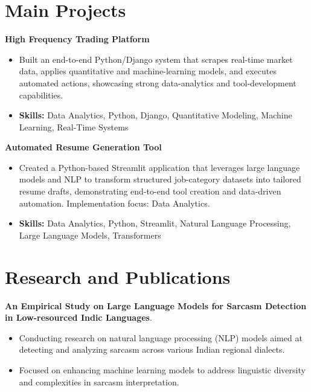 \documentclass[a4paper,11pt]{article}
\begin{document}
\section{\textbf{Main Projects}}

\vspace{1mm}
  \textbf{High Frequency Trading Platform  }
\vspace{-1.5mm} %
\begin{itemize}
  \item Built an end-to-end Python/Django system that scrapes real-time market data, applies quantitative and machine-learning models, and executes automated actions, showcasing strong data-analytics and tool-development capabilities.
\vspace{-3mm}
  \item \textbf{Skills:} Data Analytics, Python, Django, Quantitative Modeling, Machine Learning, Real-Time Systems
\end{itemize}


\vspace{1mm}
   \textbf{Automated Resume Generation Tool }
\vspace{-1.5mm} %
\begin{itemize}
  \item Created a Python-based Streamlit application that leverages large language models and NLP to transform structured job-category datasets into tailored resume drafts, demonstrating end-to-end tool creation and data-driven automation. Implementation focus: Data Analytics.
\vspace{-3mm}
  \item \textbf{Skills:} Data Analytics, Python, Streamlit, Natural Language Processing, Large Language Models, Transformers
\end{itemize}



\section{\textbf{Research and Publications} \hfill }
\vspace{1mm}
  \textbf{An Empirical Study on Large Language Models for Sarcasm Detection in Low-resourced Indic Languages}.
\vspace{-1mm} %
\begin{itemize}
  \item Conducting research on natural language processing (NLP) models aimed at detecting and analyzing sarcasm across various Indian regional dialects.
\vspace{-3mm}
  \item Focused on enhancing machine learning models to address linguistic diversity and complexities in sarcasm interpretation.
\end{itemize}
\end{document}
